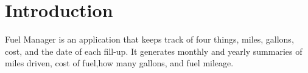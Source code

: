 \chapter{Introduction}

Fuel Manager is an application that keeps track of four things, miles, gallons, cost, and
the date of each fill-up.  It generates monthly and yearly summaries of miles driven, 
cost of fuel,how many gallons, and fuel mileage.

